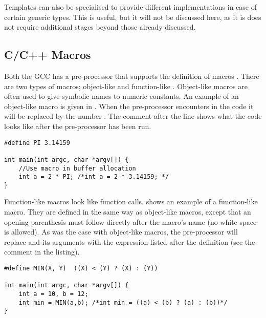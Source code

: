 Templates can also be specialised to provide different implementations in case of certain generic types. This is useful, but it will not be discussed here, as it is does not require additional stages beyond those already discussed.

\subsection{C/C++ Macros}
Both the \ac{GCC} has a pre-processor that supports the definition of macros \cite{c:macros}. There are two types of macros; object-like \cite{c:macros:object} and function-like \cite{c:macros:function}. Object-like macros are often used to give symbolic names to numeric constants. An example of an object-like macro is given in . When the pre-processor encounters  in the code it will be replaced by the number . The comment after the line shows what the code looks like after the pre-processor has been run.
\begin{lstlisting}[label={lst:c:object:macro}, caption={C/C++ object-like macro}, style={C}]
#define PI 3.14159

int main(int argc, char *argv[]) {
    //Use macro in buffer allocation
    int a = 2 * PI; /*int a = 2 * 3.14159; */
}
\end{lstlisting}
Function-like macros look like function calls.  shows an example of a function-like macro. They are defined in the same way as object-like macros, except that an opening parenthesis must follow directly after the macro's name (no white-space is allowed). As was the case with object-like macros, the pre-processor will replace  and its arguments with the expression listed after the definition (see the comment in the listing).
\begin{lstlisting}[label={lst:c:function:macro}, caption={C/C++ function-like macro}, style={C}]
#define MIN(X, Y)  ((X) < (Y) ? (X) : (Y))

int main(int argc, char *argv[]) {
    int a = 10, b = 12;
    int min = MIN(a,b); /*int min = ((a) < (b) ? (a) : (b))*/
}
\end{lstlisting}

